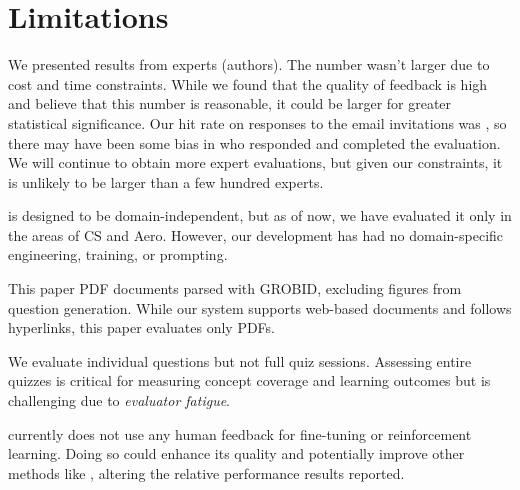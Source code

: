 \section*{Limitations}

 We presented results from \totalevaluators experts (authors). The number wasn't larger due to cost and time constraints. While we found that the quality of feedback is high and believe that this number is reasonable, it could be larger for greater statistical significance. Our hit rate on responses to the email invitations was \hitresponse, so there may have been some bias in who responded and completed the evaluation. We will continue to obtain more expert evaluations, but given our constraints, it is unlikely to be larger than a few hundred experts. 

 \name is designed to be domain-independent, but as of now, we have evaluated it only in the areas of CS and Aero. However, our development has had no domain-specific engineering, training, or prompting. 

 This paper PDF documents parsed with GROBID, excluding figures from question generation. While our system supports web-based documents and follows hyperlinks, this paper evaluates only PDFs.



 We evaluate individual questions but not full quiz sessions. Assessing entire quizzes is critical for measuring concept coverage and learning outcomes but is challenging due to {\em evaluator fatigue}.

 \name currently does not use any human feedback for fine-tuning or reinforcement learning. Doing so could enhance its quality and potentially improve other methods like \Baseline, altering the relative performance results reported.


